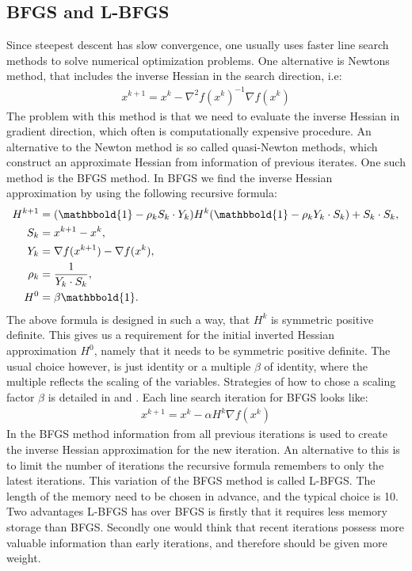 \subsection{BFGS and L-BFGS}
Since steepest descent has slow convergence, one usually uses faster line search methods to solve numerical optimization problems. One alternative is Newtons method, that includes the inverse Hessian in the search direction, i.e:
\begin{align*}
x^{k+1} = x^k - \nabla^2 f(x^k)^{-1}\nabla f(x^k) \label{Newton}
\end{align*}
The problem with this method is that we need to evaluate the inverse Hessian in gradient direction, which often is computationally expensive procedure. An alternative to the Newton method is so called quasi-Newton methods, which construct an approximate Hessian from information of previous iterates. One such method is the BFGS method\cite{broyden1970convergence,fletcher1970new,goldfarb1970family, shanno1970conditioning}. In BFGS we find the inverse Hessian approximation by using the following recursive formula:
\begin{align*}
H^{k+1} &= (\mathbbold{1}-\rho_kS_k\cdot Y_k)H^k(\mathbbold{1} -\rho_kY_k\cdot S_k) + S_k\cdot S_k, \\
S_k &= x^{k+1}-x^{k}, \\
Y_k &= \nabla f(x^{k+1})-\nabla f(x^{k}),\\
\rho_k &= \frac{1}{Y_k\cdot S_k}, \\
H^0&=\beta\mathbbold{1}.
\end{align*}
The above formula is designed in such a way, that $H^k$ is symmetric positive definite. This gives us a requirement for the initial inverted Hessian approximation $H^0$, namely that it needs to be symmetric positive definite. The usual choice however, is just identity or a multiple $\beta$ of identity, where the multiple reflects the scaling of the variables. Strategies of how to chose a scaling factor $\beta$ is detailed in \cite{liu1989limited} and  \cite{gilbert1989some}. Each line search iteration for BFGS looks like:
\begin{align*}
x^{k+1} = x^k - \alpha H^{k}\nabla f(x^k)
\end{align*} 
In the BFGS method information from all previous iterations is used to create the inverse Hessian approximation for the new iteration. An alternative to this is to limit the number of iterations the recursive formula remembers to only the latest iterations. This variation of the BFGS method is called L-BFGS\cite{nocedal1980updating}. The length of the memory need to be chosen in advance, and the typical choice is 10. Two advantages L-BFGS has over BFGS is firstly that it requires less memory storage than BFGS. Secondly one would think that recent iterations possess more valuable information than early iterations, and therefore should be given more weight. 
